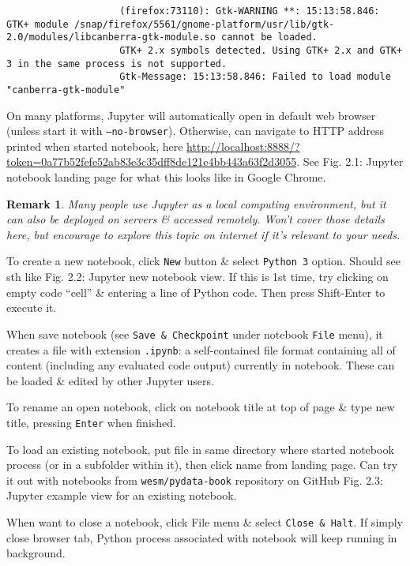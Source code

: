 \documentclass{article}
\newtheorem{remark}{Remark}
\begin{document}
\begin{enumerate}
\begin{itemize}
\begin{itemize}
\begin{itemize}
\begin{verbatim}
					(firefox:73110): Gtk-WARNING **: 15:13:58.846: GTK+ module /snap/firefox/5561/gnome-platform/usr/lib/gtk-2.0/modules/libcanberra-gtk-module.so cannot be loaded.
					GTK+ 2.x symbols detected. Using GTK+ 2.x and GTK+ 3 in the same process is not supported.
					Gtk-Message: 15:13:58.846: Failed to load module "canberra-gtk-module"
				\end{verbatim}
				On many platforms, Jupyter will automatically open in default web browser (unless start it with {\tt--no-browser}). Otherwise, can navigate to HTTP address printed when started notebook, here \url{http://localhost:8888/?token=0a77b52fefe52ab83e3c35dff8de121e4bb443a63f2d3055}. See {\sf Fig. 2.1: Jupyter notebook landing page} for what this looks like in Google Chrome.				
				\begin{remark}
					Many people use Jupyter as a local computing environment, but it can also be deployed on servers \& accessed remotely. Won't cover those details here, but encourage to explore this topic on internet if it's relevant to your needs.
				\end{remark}
				To create a new notebook, click {\tt New} button \& select {\tt Python 3} option. Should see sth like {\sf Fig. 2.2: Jupyter new notebook view}. If this is 1st time, try clicking on empty code ``cell'' \& entering a line of Python code. Then press Shift-Enter to execute it.
				
				When save notebook (see {\tt Save \& Checkpoint} under notebook {\tt File} menu), it creates a file with extension {\tt.ipynb}: a self-contained file format containing all of content (including any evaluated code output) currently in notebook. These can be loaded \& edited by other Jupyter users.
				
				To rename an open notebook, click on notebook title at top of page \& type new title, pressing {\tt Enter} when finished.
				
				To load an existing notebook, put file in same directory where started notebook process (or in a subfolder within it), then click name from landing page. Can try it out with notebooks from {\tt wesm/pydata-book} repository on GitHub {\sf Fig. 2.3: Jupyter example view for an existing notebook}.
				
				When want to close a notebook, click File menu \& select {\tt Close \& Halt}. If simply close browser tab, Python process associated with notebook will keep running in background.
				

\end{itemize}
\end{itemize}
\end{itemize}
\end{enumerate}
\end{document}

